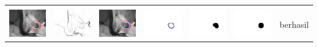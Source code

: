 \begin{table}[H]
\begin{tabular}{|m{0.7in}|m{0.7in}|m{0.7in}|m{0.7in}|m{0.7in}|m{0.7in}|m{0.7in}|}
		&  &  & & & &  \\
		\includegraphics[width=0.7in]{dataset/dataset_3/luka_hitam/ready/8_integer_init.jpg}&
		\includegraphics[width=0.7in]{dataset/dataset_3/luka_hitam/ready/8_integer_ext.jpg}&
		\includegraphics[width=0.7in]{dataset/dataset_3/luka_hitam/ready/8_integer_result.jpg}&
		\includegraphics[width=0.7in]{dataset/dataset_3/luka_hitam/ready/8_gt_r_integer.jpg}&
		\includegraphics[width=0.7in]{dataset/dataset_3/luka_hitam/ready/8_r.jpg}&
		\includegraphics[width=0.7in]{dataset/dataset_3/luka_hitam/ready/8_integer_r.jpg}&
		berhasil\\
		\hline
		

\end{tabular}
\end{table}
